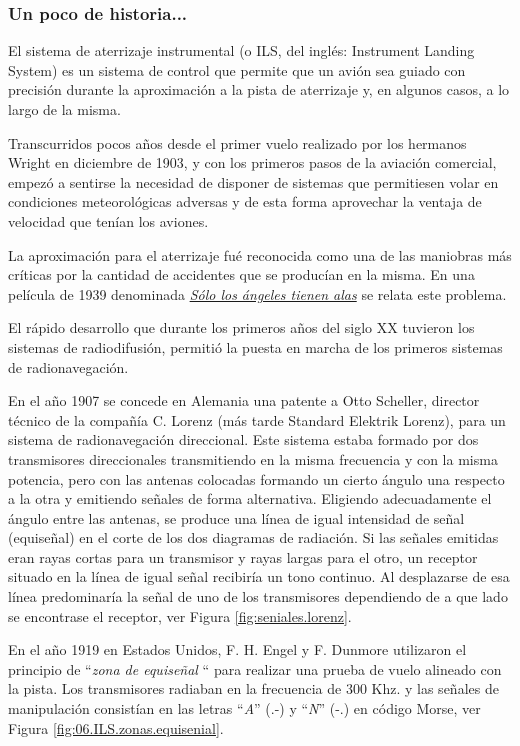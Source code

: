 \subsubsection{Un poco de historia...}
\label{sec:06.ILS.historia}

El sistema de aterrizaje instrumental (o ILS, del inglés: Instrument Landing System) es un sistema de control que permite que un avión sea guiado con precisión durante la aproximación a la pista de aterrizaje y, en algunos casos, a lo largo de la misma.

Transcurridos pocos años desde el primer vuelo realizado por los hermanos Wright en diciembre de 1903, y con los primeros pasos de la aviación comercial, empezó a sentirse la necesidad de disponer de sistemas que permitiesen volar en condiciones meteorológicas adversas y de esta forma aprovechar la ventaja de velocidad que tenían los aviones.

La aproximación para el aterrizaje fué reconocida como una de las maniobras más críticas por la cantidad de accidentes que se producían en la misma. En una película de 1939 denominada \href{https://www.youtube.com/watch?v=g7MbduUCKDA}{ \emph{Sólo los ángeles tienen alas}} se relata este problema.



El rápido desarrollo que durante los primeros años del siglo XX tuvieron los sistemas de radiodifusión, permitió la puesta en marcha de los primeros sistemas de radionavegación.

En el año 1907 se concede en Alemania una patente a Otto Scheller, director técnico de la compañía C. Lorenz (más tarde Standard Elektrik Lorenz), para un sistema de radionavegación direccional. Este sistema estaba formado por dos transmisores direccionales transmitiendo en la misma frecuencia y con la misma potencia, pero con las antenas colocadas formando un cierto ángulo una respecto a la otra y emitiendo señales  de forma alternativa. Eligiendo adecuadamente el ángulo entre las antenas, se produce una línea de igual intensidad de señal (equiseñal) en el corte de los dos diagramas de radiación. Si las señales emitidas eran rayas cortas para un transmisor y rayas largas para el otro, un receptor situado en la línea de igual señal recibiría un tono continuo. Al desplazarse de esa línea predominaría la señal de uno de los transmisores dependiendo de a que lado se encontrase el receptor, ver Figura \ref{fig:seniales.lorenz}.

En el año 1919 en Estados Unidos, F. H. Engel y F. Dunmore utilizaron el principio de ``\emph{zona de equiseñal} `` para realizar una prueba de vuelo alineado con la pista. Los transmisores radiaban en la frecuencia de 300 Khz. y las señales de manipulación consistían en las letras ``\emph{A}'' (.-) y ``\emph{N}'' (-.) en código Morse, ver Figura \ref{fig:06.ILS.zonas.equisenial}.

